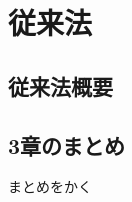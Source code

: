 \documentclass[./_thesis]{subfiles}
\begin{document}
\chapter{従来法}
\section{従来法概要}
\begin{spacing}{2.0}
\section{3章のまとめ}
まとめをかく
\end{spacing}
\end{document}
